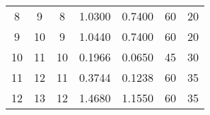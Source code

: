 \begin{table}[]
\begin{adjustbox}{width=1.1\textwidth,center=\textwidth}
\begin{tabular}{@{}ccccccc@{}}
8                                                              & 9                                                              & 8                                                    & 1.0300                                                                         & 0.7400                                                                         & 60                                                                               & 20                                                                                   \\
9                                                              & 10                                                             & 9                                                    & 1.0440                                                                         & 0.7400                                                                         & 60                                                                               & 20                                                                                   \\
10                                                             & 11                                                             & 10                                                   & 0.1966                                                                         & 0.0650                                                                         & 45                                                                               & 30                                                                                   \\
11                                                             & 12                                                             & 11                                                   & 0.3744                                                                         & 0.1238                                                                         & 60                                                                               & 35                                                                                   \\
12                                                             & 13                                                             & 12                                                   & 1.4680                                                                         & 1.1550                                                                         & 60                                                                               & 35                                                                                   \\

\end{tabular}
\end{adjustbox}
\end{table}
